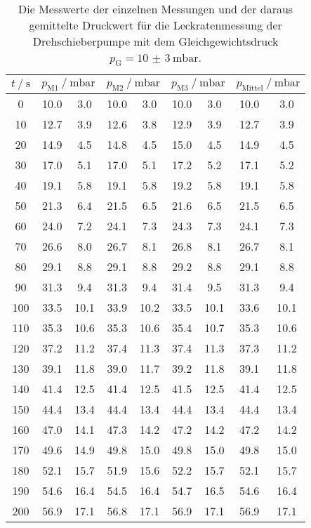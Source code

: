   \begin{table}[h]
    \centering
    \caption{Die Messwerte der einzelnen Messungen und der daraus gemittelte Druckwert für die Leckratenmessung der Drehschieberpumpe mit dem
    Gleichgewichtsdruck $p_\text{G} = \SI{10(3)}{\milli\bar}$.}
    \label{tab:dreh_leck_10}
    \begin{tabular}{S[table-format=3.0] S @{${}\pm{}$} S S @{${}\pm{}$} S S @{${}\pm{}$} S S @{${}\pm{}$} S}
    \toprule
    {$t \mathbin{/} \si{\second} $} &  &  &  &  \\
     & 10.0 &  3.0 & 10.0 &  3.0 & 10.0 &  3.0 & 10.0 &  3.0 \\
     10 & 12.7 &  3.9 & 12.6 &  3.8 & 12.9 &  3.9 & 12.7 &  3.9 \\
     20 & 14.9 &  4.5 & 14.8 &  4.5 & 15.0 &  4.5 & 14.9 &  4.5 \\
     30 & 17.0 &  5.1 & 17.0 &  5.1 & 17.2 &  5.2 & 17.1 &  5.2 \\
     40 & 19.1 &  5.8 & 19.1 &  5.8 & 19.2 &  5.8 & 19.1 &  5.8 \\
     50 & 21.3 &  6.4 & 21.5 &  6.5 & 21.6 &  6.5 & 21.5 &  6.5 \\
     60 & 24.0 &  7.2 & 24.1 &  7.3 & 24.3 &  7.3 & 24.1 &  7.3 \\
     70 & 26.6 &  8.0 & 26.7 &  8.1 & 26.8 &  8.1 & 26.7 &  8.1 \\
     80 & 29.1 &  8.8 & 29.1 &  8.8 & 29.2 &  8.8 & 29.1 &  8.8 \\
     90 & 31.3 &  9.4 & 31.3 &  9.4 & 31.4 &  9.5 & 31.3 &  9.4 \\
    100 & 33.5 & 10.1 & 33.9 & 10.2 & 33.5 & 10.1 & 33.6 & 10.1 \\
    110 & 35.3 & 10.6 & 35.3 & 10.6 & 35.4 & 10.7 & 35.3 & 10.6 \\
    120 & 37.2 & 11.2 & 37.4 & 11.3 & 37.4 & 11.3 & 37.3 & 11.2 \\
    130 & 39.1 & 11.8 & 39.0 & 11.7 & 39.2 & 11.8 & 39.1 & 11.8 \\
    140 & 41.4 & 12.5 & 41.4 & 12.5 & 41.5 & 12.5 & 41.4 & 12.5 \\
    150 & 44.4 & 13.4 & 44.4 & 13.4 & 44.4 & 13.4 & 44.4 & 13.4 \\
    160 & 47.0 & 14.1 & 47.3 & 14.2 & 47.2 & 14.2 & 47.2 & 14.2 \\
    170 & 49.6 & 14.9 & 49.8 & 15.0 & 49.8 & 15.0 & 49.8 & 15.0 \\
    180 & 52.1 & 15.7 & 51.9 & 15.6 & 52.2 & 15.7 & 52.1 & 15.7 \\
    190 & 54.6 & 16.4 & 54.5 & 16.4 & 54.7 & 16.5 & 54.6 & 16.4 \\
    200 & 56.9 & 17.1 & 56.8 & 17.1 & 56.9 & 17.1 & 56.9 & 17.1 \\
    \bottomrule
    \end{tabular}
  \end{table}

